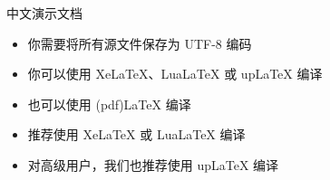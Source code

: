 \documentclass{ctexbeamer}
\begin{document}
\begin{frame}{中文演示文档}
    \begin{itemize}
        \item 你需要将所有源文件保存为 UTF-8 编码
        \item 你可以使用 XeLaTeX、LuaLaTeX 或 upLaTeX 编译
        \item 也可以使用 (pdf)LaTeX 编译
        \item 推荐使用 XeLaTeX 或 LuaLaTeX 编译
        \item 对高级用户，我们也推荐使用 upLaTeX 编译
    \end{itemize}
\end{frame}
\end{document}
